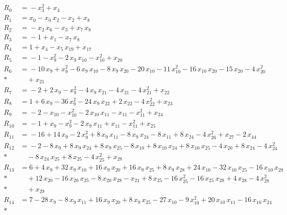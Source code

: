 \begingroup\small
\setlength{\jot}{1pt}
\begin{align*}
R_{0} &={} -x_{3}^{2} +x_{4} \\[3pt]
R_{1} &={} x_{0} -x_{0}\,x_{2} -x_{2} +x_{8} \\[3pt]
R_{2} &={} -x_{2}\,x_{6} -x_{3} +x_{7}\,x_{8} \\[3pt]
R_{3} &={} -1 +x_{1} -x_{7}\,x_{8} \\[3pt]
R_{4} &={} 1 +x_{4} -x_{5}\,x_{19} +x_{17} \\[3pt]
R_{5} &={} -1 -x_{9}^{2} -2\,x_{9}\,x_{10} -x_{10}^{2} +x_{20} \\[3pt]
R_{6} &={} -10\,x_{9} +x_{9}^{2} -6\,x_{9}\,x_{10} -8\,x_{9}\,x_{20} -20\,x_{10} -11\,x_{10}^{2} -16\,x_{10}\,x_{20} -15\,x_{20} -4\,x_{20}^{2} \\*
&\quad{} +x_{21} \\[3pt]
R_{7} &={} -2 +2\,x_{9} -x_{9}^{2} -4\,x_{9}\,x_{21} -4\,x_{21} -4\,x_{21}^{2} +x_{22} \\[3pt]
R_{8} &={} 1 +6\,x_{9} -36\,x_{9}^{2} -24\,x_{9}\,x_{22} +2\,x_{22} -4\,x_{22}^{2} +x_{23} \\[3pt]
R_{9} &={} -2 -x_{10} -x_{10}^{2} -2\,x_{10}\,x_{11} -x_{11} -x_{11}^{2} +x_{24} \\[3pt]
R_{10} &={} -1 +x_{9} -x_{9}^{2} -2\,x_{9}\,x_{11} +x_{11} -x_{11}^{2} +x_{25} \\[3pt]
R_{11} &={} -16 +14\,x_{9} -2\,x_{9}^{2} +8\,x_{9}\,x_{11} -8\,x_{9}\,x_{24} -8\,x_{11} +8\,x_{24} -4\,x_{26}^{2} +x_{27} -2\,x_{44} \\[3pt]
R_{12} &={} -2 -8\,x_{9} +8\,x_{9}\,x_{24} +8\,x_{9}\,x_{25} -8\,x_{10} +8\,x_{10}\,x_{24} +8\,x_{10}\,x_{25} -4\,x_{20} +8\,x_{24} -4\,x_{24}^{2} \\*
&\quad{} -8\,x_{24}\,x_{25} +8\,x_{25} -4\,x_{25}^{2} +x_{28} \\[3pt]
R_{13} &={} 6 +4\,x_{9} +32\,x_{9}\,x_{10} +16\,x_{9}\,x_{20} +16\,x_{9}\,x_{25} +8\,x_{9}\,x_{28} +24\,x_{10} -32\,x_{10}\,x_{25} -16\,x_{10}\,x_{28} \\*
&\quad{} +12\,x_{20} -16\,x_{20}\,x_{25} -8\,x_{20}\,x_{28} -x_{21} +8\,x_{25} -16\,x_{25}^{2} -16\,x_{25}\,x_{28} +4\,x_{28} -4\,x_{28}^{2} \\*
&\quad{} +x_{29} \\[3pt]
R_{14} &={} 7 -28\,x_{9} -8\,x_{9}\,x_{11} +16\,x_{9}\,x_{20} +8\,x_{9}\,x_{25} -27\,x_{10} -9\,x_{10}^{2} +20\,x_{10}\,x_{11} -16\,x_{10}\,x_{24} \\*

\end{align*}
